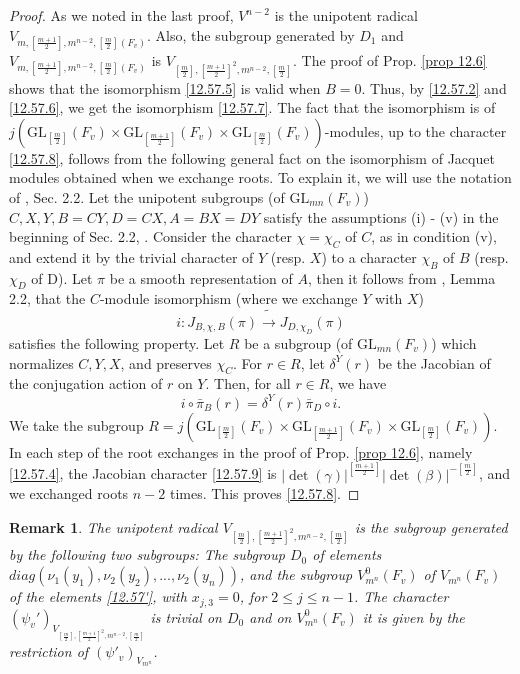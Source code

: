 \documentclass[12pts]{amsart}
\newcommand{\GL}{{\mathrm{GL}}}
\newtheorem{rmk}[thm]{Remark}
\begin{document}
\begin{proof}
As we noted in the last proof, $V^{n-2}$ is the unipotent radical\\ $V_{m,[\frac{m+1}{2}],m^{n-2},[\frac{m}{2}](F_v)}$. Also, the subgroup generated by $D_1$ and
 $V_{m,[\frac{m+1}{2}],m^{n-2},[\frac{m}{2}](F_v)}$ is $V_{[\frac{m}{2}],[\frac{m+1}{2}]^2,m^{n-2},[\frac{m}{2}]}$. The proof of Prop. \ref{prop 12.6} shows that the isomorphism \eqref{12.57.5} is valid when $B=0$. Thus, by \eqref{12.57.2} and \eqref{12.57.6}, we get the isomorphism \eqref{12.57.7}. The fact that the isomorphism is of $j(\GL_{[\frac{m}{2}]}(F_v)\times \GL_{[\frac{m+1}{2}]}(F_v)\times \GL_{[\frac{m}{2}]}(F_v))$-modules, up to the character \eqref{12.57.8}, follows from the following general fact on the isomorphism of Jacquet modules obtained when we exchange roots. To explain it, we will use the notation of \cite{GRS99}, Sec. 2.2. Let the unipotent subgroups (of $\GL_{mn}(F_v)$) $C, X, Y, B=CY, D=CX, A=BX=DY$ satisfy the assumptions (i) - (v) in the beginning of Sec. 2.2, \cite{GRS99}. Consider the character $\chi=\chi_C$ of $C$,  as in condition (v), and extend it by the trivial character of $Y$ (resp. $X$) to a character $\chi_B$ of $B$ (resp. $\chi_D$ of D). Let $\pi$ be a smooth representation of $A$, then it follows from \cite{GRS99}, Lemma 2.2, that the $C$-module isomorphism (where we exchange $Y$ with $X$)
 $$
 i: J_{B,\chi,B}(\pi)\widetilde{\rightarrow} J_{D,\chi_D}(\pi)
 $$
 satisfies the following property. Let $R$ be a subgroup (of $\GL_{mn}(F_v)$) which normalizes $C, Y, X$, and preserves $\chi_C$. For $r\in R$, let $\delta^Y(r)$ be the Jacobian of the conjugation action of $r$ on $Y$. Then, for all $r\in R$, we have
 \begin{equation}\label{12.57.9}
 i\circ \bar{\pi}_B(r)=\delta^Y(r)\bar{\pi}_D\circ i.
 \end{equation}
 We take the subgroup $R=j(\GL_{[\frac{m}{2}]}(F_v)\times \GL_{[\frac{m+1}{2}]}(F_v)\times \GL_{[\frac{m}{2}]}(F_v))$. In each step of the root exchanges in the proof of Prop. \ref{prop 12.6}, namely \eqref{12.57.4}, the Jacobian character \eqref{12.57.9} is $|\det(\gamma)|^{[\frac{m+1}{2}]}|\det(\beta)|^{-[\frac{m}{2}]}$, and we exchanged roots $n-2$ times. This proves \eqref{12.57.8}.  

\end{proof}	

\begin{rmk}\label{rmk 12.8}
	The unipotent radical $V_{[\frac{m}{2}],[\frac{m+1}{2}]^2,m^{n-2},[\frac{m}{2}]}$ is the subgroup generated by the following two subgroups: The subgroup $D_0$ of elements\\
	 $diag(\nu_1(y_1),\nu_2(y_2),...,\nu_2(y_n))$, and the subgroup $V^0_{m^n}(F_v)$ of $V_{m^n}(F_v)$ of the elements \eqref{12.57'}, with $x_{j,3}=0$, for $2\leq j\leq n-1$. The character $(\psi_v')_{V_{[\frac{m}{2}],[\frac{m+1}{2}]^2,m^{n-2},[\frac{m}{2}]}}$ is trivial on $D_0$ and on $V^0_{m^n}(F_v)$ it is given by the restriction of $(\psi'_v)_{V_{m^n}}$.
\end{rmk}
\end{document}

